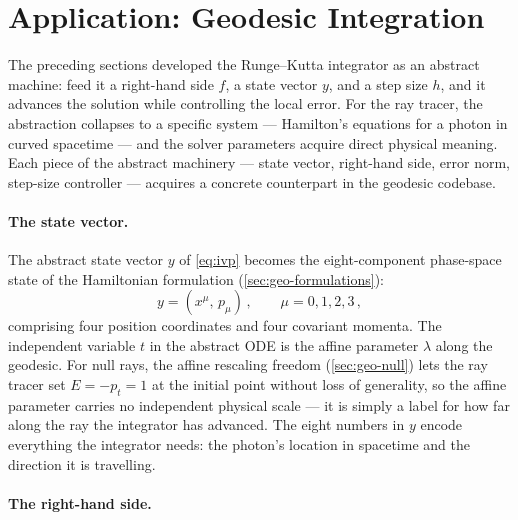 \section{Application: Geodesic Integration}
\label{sec:rk-geodesic-application}

The preceding sections developed the Runge--Kutta integrator as an
abstract machine: feed it a right-hand side $f$, a state vector $y$,
and a step size $h$, and it advances the solution while controlling the
local error.  For the ray tracer, the abstraction collapses to a
specific system --- Hamilton's equations for a photon in curved
spacetime --- and the solver parameters acquire direct physical
meaning.  Each piece of the abstract machinery --- state vector,
right-hand side, error norm, step-size controller --- acquires a
concrete counterpart in the geodesic codebase.

\paragraph{The state vector.}

The abstract state vector $y$ of \cref{eq:ivp} becomes the
eight-component phase-space state of the Hamiltonian formulation
(\cref{sec:geo-formulations}):
%
\begin{equation}
  y = (x^\mu,\, p_\mu) \,, \qquad \mu = 0, 1, 2, 3 \,,
  \label{eq:geodesic-state}
\end{equation}
%
comprising four position coordinates and four covariant momenta.  The
independent variable $t$ in the abstract ODE is the affine parameter
$\lambda$ along the geodesic.  For null rays, the affine rescaling
freedom (\cref{sec:geo-null}) lets the ray tracer set $E = -p_t = 1$
at the initial point without loss of generality, so the affine
parameter carries no independent physical scale --- it is simply a
label for how far along the ray the integrator has advanced.  The eight
numbers in $y$ encode everything the integrator needs: the photon's
location in spacetime and the direction it is travelling.

\paragraph{The right-hand side.}

